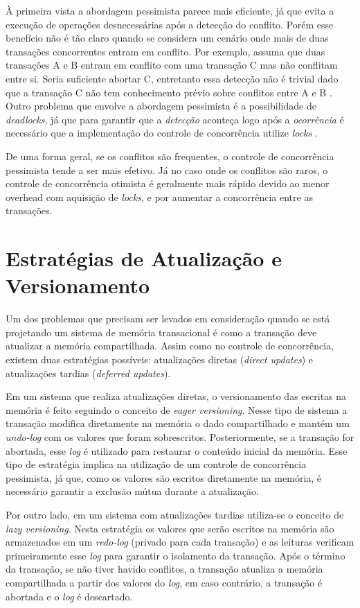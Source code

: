 À primeira vista a abordagem pessimista parece mais eficiente, já que evita a execução de operações desnecessárias após a detecção do conflito. Porém esse benefício não é tão claro quando se considera um cenário onde mais de duas transações concorrentes entram em conflito. Por exemplo, assuma que duas transações A e B entram em conflito com uma transação C mas não conflitam entre si. Seria suficiente abortar C, entretanto essa detecção não é trivial dado que a transação C não tem conhecimento prévio sobre conflitos entre A e B \cite{spear2006conflict}. Outro problema que envolve a abordagem pessimista é a possibilidade de \emph{deadlocks}, já que para garantir que a \emph{detecção} aconteça logo após a \emph{ocorrência} é necessário que a implementação do controle de concorrência utilize \emph{locks} \cite{harris2010transactional}.

De uma forma geral, se os conflitos são frequentes, o controle de concorrência pessimista tende a ser mais efetivo. Já no caso onde os conflitos são raros, o controle de concorrência otimista é geralmente mais rápido devido ao menor overhead com aquisição de \emph{locks}, e por aumentar a concorrência entre as transações.


\section{Estratégias de Atualização e Versionamento}

Um dos problemas que precisam ser levados em consideração quando se está projetando um sistema de memória transacional é como a transação deve atualizar a memória compartilhada. Assim como no controle de concorrência, existem duas estratégias possíveis: atualizações diretas (\emph{direct updates}) e atualizações tardias (\emph{deferred updates}). \cite{herzeel2009reusable}

Em um sistema que realiza atualizações diretas, o versionamento das escritas na memória é feito seguindo o conceito de \emph{eager versioning}. Nesse tipo de sistema a transação modifica diretamente na memória o dado compartilhado e mantém um \emph{undo-log} com os valores que foram sobrescritos. Posteriormente, se a transação for abortada, esse \emph{log} é utilizado para restaurar o conteúdo inicial da memória. Esse tipo de estratégia implica na utilização de um controle de concorrência pessimista, já que, como os valores são escritos diretamente na memória, é necessário garantir a exclusão mútua durante a atualização.

Por outro lado, em um sistema com atualizações tardias utiliza-se o conceito de \emph{lazy versioning}. Nesta estratégia os valores que serão escritos na memória são armazenados em um \emph{redo-log} (privado para cada transação) e as leituras verificam primeiramente esse \emph{log} para garantir o isolamento da transação. Após o término da transação, se não tiver havido conflitos, a transação atualiza a memória compartilhada a partir dos valores do \emph{log}, em caso contrário, a transação é abortada e o \emph{log} é descartado. 

